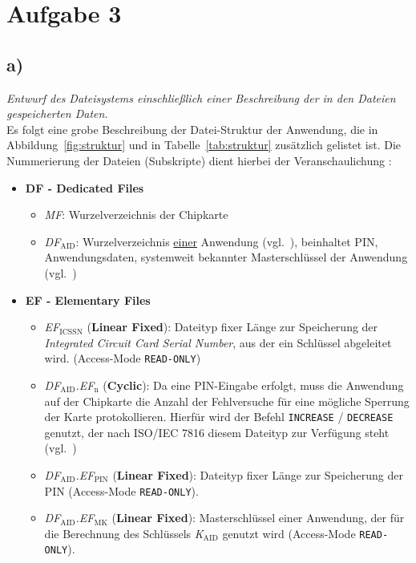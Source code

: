 \chapter{Aufgabe 3}

\section{a)}

\textit{Entwurf des Dateisystems einschließlich einer Beschreibung der in den Dateien
gespeicherten Daten.}\\

\noindent
Es folgt eine grobe Beschreibung der Datei-Struktur der Anwendung, die in Abbildung~\ref{fig:struktur} und in Tabelle~\ref{tab:struktur} zusätzlich gelistet ist.
Die Nummerierung der Dateien (Subskripte) dient hierbei der Veranschaulichung :

\begin{itemize}
    \itemsep0.5em
    \item \textbf{DF - Dedicated Files}
    \begin{itemize}
        \item \textit{MF}: Wurzelverzeichnis der Chipkarte
        \item \textit{DF$_{\text{AID}}$}: Wurzelverzeichnis \underline{einer} Anwendung (vgl.~\cite[60]{ITS5}), beinhaltet PIN, Anwendungsdaten, systemweit bekannter Masterschlüssel der Anwendung (vgl.~\cite[46]{ITS5})
    \end{itemize}
    \item \textbf{EF - Elementary Files}
    \begin{itemize}
    \item  \textit{EF$_{\text{ICSSN}}$} (\textbf{Linear Fixed}): Dateityp fixer Länge zur Speicherung der \textit{Integrated Circuit Card Serial Number}, aus der ein Schlüssel abgeleitet wird.
    (Access-Mode \texttt{READ-ONLY})
    \item \textit{DF$_{\text{AID}}$.EF$_{\text{n}}$} (\textbf{Cyclic}): Da eine PIN-Eingabe erfolgt, muss die Anwendung auf der Chipkarte die Anzahl der Fehlversuche
    für eine mögliche Sperrung der Karte protokollieren.
    Hierfür wird der Befehl \texttt{INCREASE} / \texttt{DECREASE} genutzt,
    der nach ISO/IEC 7816 diesem Dateityp zur Verfügung steht (vgl.~\cite[45]{ITS5})
    \item \textit{DF$_{\text{AID}}$.EF$_{\text{PIN}}$} (\textbf{Linear Fixed}): Dateityp fixer Länge zur Speicherung der PIN (Access-Mode \texttt{READ-ONLY}).
    \item \textit{DF$_{\text{AID}}$.EF$_{\text{MK}}$} (\textbf{Linear Fixed}): Masterschlüssel einer Anwendung, der für die Berechnung des Schlüssels \textit{K$_{\text{AID}}$} genutzt wird (Access-Mode \texttt{READ-ONLY}).
        \end{itemize}
\end{itemize}


